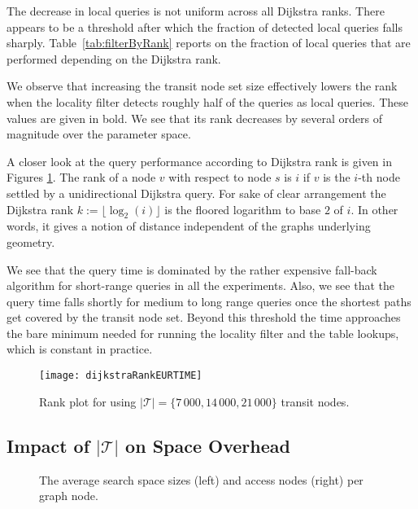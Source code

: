 \documentclass{llncs}
\begin{document}
The decrease in local queries is not uniform across all Dijkstra ranks.
There appears to be a threshold after which the fraction of detected local queries falls sharply.
Table~\ref{tab:filterByRank} reports on the fraction of local queries that are performed depending on the Dijkstra rank.

We observe that increasing the transit node set size effectively lowers the rank when the locality filter detects roughly half of the queries as local queries.
These values are given in bold.
We see that its rank decreases by several orders of magnitude over the parameter space.

A closer look at the query performance according to Dijkstra rank is given in Figures \ref{fig:rankPlots_time}.
The rank of a node $v$ with respect to node $s$ is $i$ if $v$ is the $i$-th node settled by a unidirectional Dijkstra query.
For sake of clear arrangement the Dijkstra rank $k:=\lfloor\log_2(i)\rfloor$ is the floored logarithm to base $2$ of $i$.
In other words, it gives a notion of distance independent of the graphs underlying geometry.

We see that the query time is dominated by the rather expensive fall-back algorithm for short-range queries in all the experiments.
Also, we see that the query time falls shortly for medium to long range queries once the shortest paths get covered by the transit node set.
Beyond this threshold the time approaches the bare minimum needed for running the locality filter and the table lookups, which is constant in practice.

\begin{figure}[bht]
\centering
    \texttt{[image: dijkstraRankEURTIME]}
    \caption{Rank plot for using $\vert\mathcal{T}\vert=\{7\,000, 14\,000,21\,000\}$ transit nodes.}
    \label{fig:rankPlots_time}
\end{figure}

\subsection{Impact of $\vert\mathcal{T}\vert$ on Space Overhead}
\begin{figure}[bth]
\centering
{}
\caption{The average search space sizes (left) and access nodes (right) per graph node.}
\label{fig:nodesPerNode}
\end{figure}
\end{document}
